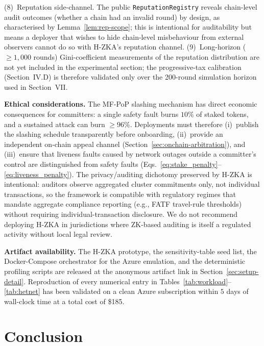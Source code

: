 \documentclass[journal]{IEEEtran}
\begin{document}
(8)~{Reputation side-channel.} The public \texttt{ReputationRegistry} reveals chain-level audit outcomes (whether a chain had an invalid round) by design, as characterised by Lemma~\ref{lem:rep-scope}; this is intentional for auditability but means a deployer that wishes to hide chain-level misbehaviour from external observers cannot do so with H-ZKA's reputation channel.
(9)~Long-horizon ($\ge 1{,}000$ rounds) Gini-coefficient measurements of the reputation distribution are not yet included in the experimental section; the progressive-tax calibration (Section~IV.D) is therefore validated only over the 200-round simulation horizon used in Section~VII.

\textbf{Ethical considerations.} The MF-PoP slashing mechanism has direct economic consequences for committers: a single safety fault burns $10\%$ of staked tokens, and a sustained attack can burn $\ge 96\%$. Deployments must therefore (i)~publish the slashing schedule transparently before onboarding, (ii)~provide an independent on-chain appeal channel (Section~\ref{sec:onchain-arbitration}), and (iii)~ensure that liveness faults caused by network outages outside a committer's control are distinguished from safety faults (Eqs.~\ref{eq:stake_penalty}--\ref{eq:liveness_penalty}). The privacy/auditing dichotomy preserved by H-ZKA is intentional: auditors observe aggregated cluster commitments only, not individual transactions, so the framework is compatible with regulatory regimes that mandate aggregate compliance reporting (e.g., FATF travel-rule thresholds) without requiring individual-transaction disclosure. We do not recommend deploying H-ZKA in jurisdictions where ZK-based auditing is itself a regulated activity without local legal review.

\textbf{Artifact availability.} The H-ZKA prototype, the sensitivity-table seed list, the Docker-Compose orchestrator for the Azure emulation, and the deterministic profiling scripts are released at the anonymous artifact link in Section~\ref{sec:setup-detail}. Reproduction of every numerical entry in Tables~\ref{tab:workload}--\ref{tab:hetnet} has been validated on a clean Azure subscription within $5$ days of wall-clock time at a total cost of \$185.

\section{Conclusion}
\end{document}
